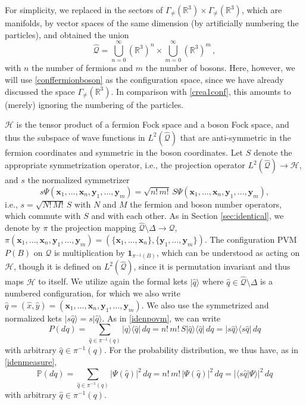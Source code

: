 \documentclass[12pt]{article}
\newcommand{\RRR}{\mathbb{R}} %
\newcommand{\1}{\mathbf{1}} %
\newcommand{\Hilbert}{\mathscr{H}}
\renewcommand{\sp}[2]{\langle #1 | #2 \rangle} %
\newcommand{\conf}{\mathcal{Q}} %
\newcommand{\measure}{\mathbb{P}} %
\newcommand{\pov}{{P}}%
\newcommand{\covering}{\pi} %
\newcommand{\Gommo}{\Gamma_{\!\neq}} %
\newcommand{\vx}{{\boldsymbol x}} %
\newcommand{\vy}{{\boldsymbol y}}
\begin{document}
For simplicity, we replaced in \cite{crea1} the sectors of $\Gommo
(\RRR^3) \times \Gommo (\RRR^3)$, which are manifolds, by vector
spaces of the same dimension (by artificially numbering the
particles), and obtained the union
\begin{equation}\label{crea1conf}
   \hat{\conf} = \bigcup_{n=0}^\infty (\RRR^3)^n \times
   \bigcup_{m=0}^\infty (\RRR^3)^m \,,
\end{equation}
with $n$ the number of fermions and $m$ the number of bosons. Here,
however, we will use \eqref{conffermionboson} as the configuration
space, since we have already discussed the space $\Gommo
(\RRR^3)$.  In comparison with \eqref{crea1conf}, this amounts to
(merely) ignoring the numbering of the particles.

$\Hilbert$ is the tensor product of a fermion Fock space and a boson
Fock space, and thus the subspace of wave functions in
$L^2(\hat{\conf})$ that are anti-symmetric in the fermion coordinates
and symmetric in the boson coordinates. Let $S$ denote the appropriate
symmetrization operator, i.e., the projection operator
$L^2(\hat{\conf}) \to \Hilbert$, and $s$ the normalized symmetrizer
\begin{equation}\label{sdef}
   s\Psi(\vx_1, \ldots, \vx_n,\vy_1, \ldots, \vy_m) = \sqrt{n!\, m!} \,
   S\Psi(\vx_1, \ldots, \vx_n,\vy_1, \ldots, \vy_m),
\end{equation}
i.e., $s = \sqrt{N! \, M!} \, S$ with $N$ and $M$ the fermion and
boson number operators, which commute with $S$ and with each other.
As in Section \ref{sec:identical}, we denote by $\covering$ the
projection mapping $\hat{\conf} \setminus \Delta \to \conf$,
$\covering(\vx_1, \ldots, \vx_n,\vy_1, \ldots, \vy_m) = (\{\vx_1,
\ldots,\vx_n\}, \{\vy_1, \ldots, \vy_m\})$.  The configuration PVM
$\pov(B)$ on $\conf$  is multiplication by
$\1_{\covering^{-1}(B)}$, which can be understood as acting on
$\Hilbert$, though it is defined on $L^2(\hat{\conf})$, since it is
permutation invariant and thus maps $\Hilbert$ to itself.  We utilize
again the formal kets $|\hat{q}\rangle$ where $\hat{q} \in \hat{\conf}
\setminus \Delta$ is a numbered configuration, for which we also write
$\hat{q} = (\hat{x},\hat{y}) = (\vx_1, \ldots, \vx_n,\vy_1, \ldots,
\vy_m)$. We also use the symmetrized and normalized kets $|s\hat{q}
\rangle = s|\hat{q} \rangle$. As   in \eqref{idenpovm}, we can write
\begin{equation}\label{crea1povm}
   \pov(dq) = \sum_{\hat{q} \in \covering^{-1}(q)} |\hat{q} \rangle
   \langle \hat{q}| \, dq = n!\, m! \, S |\hat{q} \rangle \langle
   \hat{q}| \, dq = |s\hat{q} \rangle \langle s\hat{q}| \, dq
\end{equation}
with arbitrary $\hat{q} \in \covering^{-1}(q)$. For the probability
distribution, we thus have, as  in \eqref{idenmeasure},
\begin{equation}\label{crea1measure}
   \measure(dq) = \sum_{\hat{q} \in \covering^{-1}(q)}
   |\Psi(\hat{q})|^2 \, dq  = n!\, m! \, |\Psi(\hat{q})|^2 \, dq =
   |\sp{s\hat{q}}{\Psi}|^2 \, dq
\end{equation}
with arbitrary $\hat{q} \in \covering^{-1}(q)$.
\end{document}
